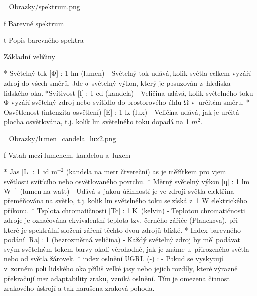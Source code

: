 \medskip {}
\picw=10cm _Obrazky/spektrum.png
\caption/f Barevné spektrum
\medskip

\midinsert {}
\caption/t Popis barevného spektra
\endinsert

\sec Základní veličiny




\begitems
* {\sbf Světelný tok [Φ]} : 1 lm (lumen) - Světelný tok udává, kolik světla celkem vyzáří zdroj do všech směrů.
    Jde o~světelný výkon, který je posuzován z~hlediska lidského oka.
*{\sbf Svítivost [I]} : 1 cd (kandela) - Veličina udává, kolik světelného toku Φ vyzáří světelný zdroj nebo svítidlo
    do prostorového úhlu Ω v~určitém směru.
* {\sbf Osvětlenost (intenzita osvětlení) [E]} : 1 lx (lux) - Veličina udává, jak je určitá plocha osvětlována,
    t.j. kolik lm světelného toku dopadá na 1 $m^2$.
\enditems

\medskip {}
\picw=5cm _Obrazky/lumen_candela_lux2.png
\caption/f Vztah mezi lumenem, kandelou a~luxem
\medskip

\begitems
* {\sbf Jas [L]} : 1 cd m$^{-2}$ (kandela na metr čtvereční)
    as je měřítkem pro vjem světlosti svítícího nebo osvětlovaného povrchu.
* {\sbf Měrný světelný výkon [η]} : 1 lm W$^{-1}$ (lumen na watt) -
    Udává s~jakou účinností je ve zdroji světla elektřina přeměňována na světlo, t.j. kolik
    lm světelného toku se získá z~1 W elektrického příkonu.
* {\sbf Teplota chromatičnosti [Tc]} : 1 K~(kelvin) - Teplotou chromatičnosti zdroje je označována ekvivalentní
    teplota tzv. černého zářiče (Planckova), při které je spektrální složení záření těchto dvou zdrojů blízké.
* {\sbf Index barevného podání [Ra]} : 1 (bezrozměrná veličina) -
    Každý světelný zdroj by měl podávat svým světelným tokem barvy okolí věrohodně, jak je známe u~přirozeného
    světla nebo od světla žárovek.
* {\sbf index oslnění UGRL (-)} : - Pokud se vyskytují v~zorném poli lidského oka příliš velké jasy nebo jejich
    rozdíly, které výrazně překračují mez adaptability zraku, vzniká oslnění. Tím je omezena činnost zrakového ústrojí a
    tak narušena zraková pohoda.
\enditems

